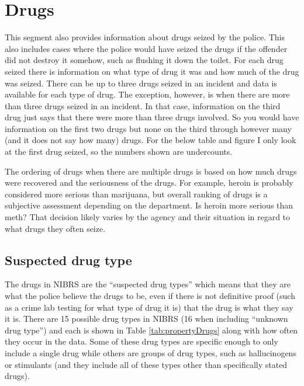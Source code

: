 \documentclass[
]{krantz}
\begin{document}
\section{Drugs}\label{drugs}

This segment also provides information about drugs seized by
the police. This also includes cases where the police would
have seized the drugs if the offender did not destroy it
somehow, such as flushing it down the toilet. For each drug
seized there is information on what type of drug it was and
how much of the drug was seized. There can be up to three
drugs seized in an incident and data is available for each
type of drug. The exception, however, is when there are more
than three drugs seized in an incident. In that case,
information on the third drug just says that there were more
than three drugs involved. So you would have information on
the first two drugs but none on the third through however
many (and it does not say how many) drugs. For the below
table and figure I only look at the first drug seized, so
the numbers shown are undercounts.

The ordering of drugs when there are multiple drugs is based
on how much drugs were recovered and the seriousness of the
drugs. For example, heroin is probably considered more
serious than marijuana, but overall ranking of drugs is a
subjective assessment depending on the department. Is heroin
more serious than meth? That decision likely varies by the
agency and their situation in regard to what drugs they
often seize.

\subsection{Suspected drug type}\label{suspected-drug-type}

The drugs in NIBRS are the ``suspected drug types'' which
means that they are what the police believe the drugs to be,
even if there is not definitive proof (such as a crime lab
testing for what type of drug it is) that the drug is what
they say it is. There are 15 possible drug types in NIBRS
(16 when including ``unknown drug type'') and each is shown
in Table \ref{tab:propertyDrugs} along with how often they
occur in the data. Some of these drug types are specific
enough to only include a single drug while others are groups
of drug types, such as hallucinogens or stimulants (and they
include all of these types other than specifically stated
drugs).
\end{document}
